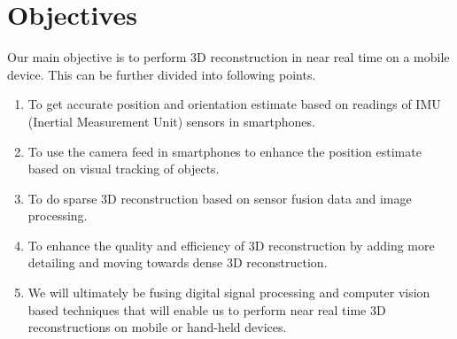 \documentclass{article}
\begin{document}
	\section{Objectives} 
		Our main objective is to perform 3D reconstruction in near real time on a mobile device. This can be further divided into following points.
		\begin{enumerate}
			\item 
				To get accurate position and orientation estimate based on readings of IMU (Inertial Measurement Unit) sensors in smartphones. 
			\item
				To use the camera feed in smartphones to enhance the position estimate based on visual tracking of objects.
			\item 
				To do sparse 3D reconstruction based on sensor fusion data and image processing.
			\item
				To enhance the quality and efficiency of 3D reconstruction by adding more detailing and moving towards dense 3D reconstruction.
			\item
				We will ultimately be fusing digital signal processing and computer vision based techniques that will enable us to perform near real time 3D reconstructions on mobile or hand-held devices.
		\end{enumerate}
\end{document}
